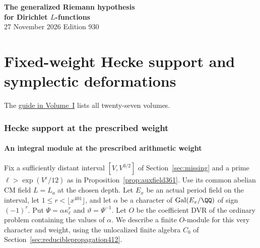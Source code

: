 \documentclass[a4paper,11pt]{article}
\theoremstyle{definition}
\theoremstyle{remark}
\numberwithin{equation}{section}
\begin{document}
\setcounter{part}{8}
\thispagestyle{plain}\begin{center}
{\LARGE\bfseries The generalized Riemann hypothesis\\[2pt]for Dirichlet \(L\)-functions}\\[6pt]
{\small 27 November 2026 \quad\textperiodcentered\quad Edition 930}\end{center}
\part{Fixed-weight Hecke support and symplectic deformations}\label{part:IX}
\begin{abstract}\noindent We study ordinary Hecke support at the prescribed arithmetic weight. Auxiliary polynomials and trace determinants relate strict cohomology to symplectic deformations and their ordinary equations.\end{abstract}
\setcounter{section}{43}
\noindent The \hyperref[seriesguide]{guide in Volume~I} lists all twenty-seven volumes.
\begingroup\small\setlength{\parskip}{0pt}\tableofcontents\endgroup
\clearpage

\section{Hecke support at the prescribed weight}\label{nav:chapter-fixed-weight-hecke}\label{nav:volume-IX}
\subsection{An integral module at the prescribed arithmetic weight}
\label{sec:fixedweightcorner415}

Fix a sufficiently distant interval \([V,V^{3/2}]\) of
Section~\ref{sec:missing} and a prime
\(\ell>\exp(V^\varepsilon/12)\) as in
Proposition~\ref{prop:auxfield361}. Use its common
abelian CM field \(L=L_a\) at the chosen depth. Let
\(E_x\) be an actual period field on the interval, let
\(1\le r<\lfloor x^{401}\rfloor\), and let \(\alpha\) be a
character of \(\operatorname{Gal}(E_x/\QQ)\) of sign
\((-1)^r\). Put \(\Psi=\alpha\kappa_\ell^r\) and
\(\vartheta=\Psi^{-1}\). Let \(O\) be the coefficient DVR
of the ordinary problem containing the values of \(\alpha\).
We describe a finite \(O\)-module for this very character
and weight, using the unlocalized finite algebra \(C_0\)
of Section~\ref{sec:reduciblepropagation412}.
\end{document}
